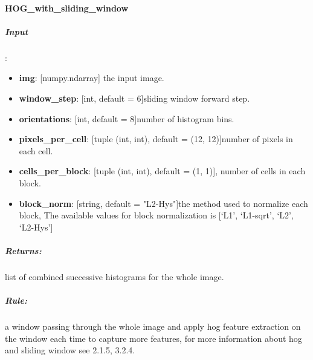 \paragraph{HOG\_with\_sliding\_window}
\subparagraph{Input}:
\begin{changemargin}{0.5cm}{0cm}
\begin{itemize}
\item  \textbf{img}: [numpy.ndarray] the input image.
\item  \textbf{window\_step}: [int, default = 6]sliding window forward step.
\item  \textbf{orientations}: [int, default = 8]number of histogram bins.
\item \textbf{pixels\_per\_cell}: [tuple (int, int), default = (12, 12)]number of pixels in each cell.
\item  \textbf{cells\_per\_block}: [tuple (int, int), default = (1, 1)], number of cells in each block.
\item  \textbf{block\_norm}: [string, default = "L2-Hys"]the method used to normalize each block, The available values for block normalization is [‘L1’, ‘L1-sqrt’, ‘L2’, ‘L2-Hys’]
\end{itemize}
\end{changemargin}

\subparagraph{Returns:}
\begin{changemargin}{0.5cm}{0cm}
list of combined successive histograms for the whole image.
\end{changemargin}

\subparagraph{Rule:} 
\begin{changemargin}{0.5cm}{0cm}
a window passing through the whole image and apply hog feature extraction on the window each time to capture more features, for more information about hog and sliding window see 2.1.5, 3.2.4.
\end{changemargin}